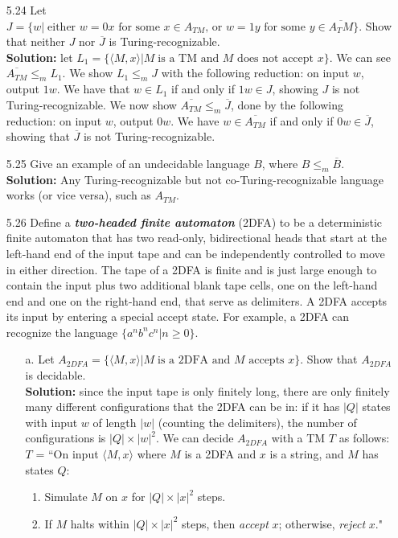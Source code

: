 \begin{enumerate}
\item[5.24]Let $J = \{w \vert\;\text{either $w=0x$ for some $x \in A_{TM}$, or $w=1y$ for some $y \in \overline{A_TM}$}\}$. Show that neither $J$ nor $\overline{J}$ is Turing-recognizable.
\\
\textbf{Solution:} let $L_1 = \{\langle M, x \rangle \vert M\;\text{is a TM and $M$ does not accept $x$}\}$. We can see $\overline{A_{TM}} \le_m L_1$. We show $L_1 \le_m J$ with the following reduction: on input $w$, output $1w$. We have that $w \in L_1$ if and only if $1w \in J$, showing $J$ is not Turing-recognizable. We now show $\overline{A_{TM}} \le_m \overline{J}$, done by the following reduction: on input $w$, output $0w$. We have $w \in \overline{A_{TM}}$ if and only if $0w \in \overline{J}$, showing that $\overline{J}$ is not Turing-recognizable.

\item[5.25]Give an example of an undecidable language $B$, where $B \le_{m} \overline{B}$.
\\
\textbf{Solution:} Any Turing-recognizable but not co-Turing-recognizable language works (or vice versa), such as $A_{TM}$.

\item[5.26]Define a \textbf{\emph{two-headed finite automaton}} (2DFA) to be a deterministic finite automaton that has two read-only, bidirectional heads that start at the left-hand end of the input tape and can be independently controlled to move in either direction. The tape of a 2DFA is finite and is just large enough to contain the input plus two additional blank tape cells, one on the left-hand end and one on the right-hand end, that serve as delimiters. A 2DFA accepts its input by entering a special accept state. For example, a 2DFA can recognize the language $\{a^nb^nc^n \vert n \ge 0\}$.
\begin{enumerate}
\item[a.]Let $A_{2DFA} = \{\langle M, x \rangle\vert M\;\text{is a 2DFA and $M$ accepts $x$}\}$. Show that $A_{2DFA}$ is decidable.
\\
\textbf{Solution:} since the input tape is only finitely long, there are only finitely many different configurations that the 2DFA can be in: if it has $|Q|$ states with input $w$ of length $|w|$ (counting the delimiters), the number of configurations is $|Q|\times|w|^2$. We can decide $A_{2DFA}$ with a TM $T$ as follows:
\\
$T$ = ``On input $\langle M, x\rangle$ where $M$ is a 2DFA and $x$ is a string, and $M$ has states $Q$:
\begin{enumerate}
\item Simulate $M$ on $x$ for $|Q|\times|x|^2$ steps.
\item If $M$ halts within $|Q|\times|x|^2$ steps, then \emph{accept} $x$; otherwise, \emph{reject} $x$."
\end{enumerate}


\end{enumerate}
\end{enumerate}

